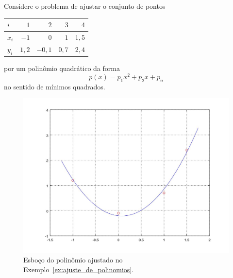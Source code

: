\begin{ex}\label{ex:ajuste_de_polinomios}
  Considere o problema de ajustar o conjunto de pontos
  \begin{center}
    \begin{tabular}{l|rrrr}
      $i$ & $1$ & $2$ & $3$ & $4$ \\\hline
      $x_i$ & $-1$ & $0$ & $1$ & $1,5$\\
      $y_i$ & $1,2$ & $-0,1$ & $0,7$ & $2,4$\\\hline
    \end{tabular}
  \end{center}
  por um polinômio quadrático da forma
  \begin{equation}
    p(x) = p_1x^2 + p_2x + p_n
  \end{equation}
  no sentido de mínimos quadrados.  

  \begin{figure}[h]
    \centering
    \includegraphics[width=\textwidth]{cap_ajuste/figs/ex_mq_poli/ex_mq_poli}
    \caption{Esboço do polinômio ajustado no Exemplo~\ref{ex:ajuste_de_polinomios}.}
    \label{fig:ex_mq_poli}
  \end{figure}
  

\end{ex}
